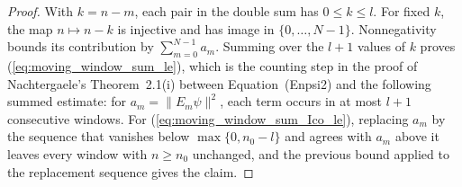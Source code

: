 \begin{proof}
    \leanok
    With $k=n-m$, each pair in the double sum has $0\leq k\leq l$.
    For fixed $k$, the map $n\mapsto n-k$ is injective and has image in
    $\{0,\ldots,N-1\}$. Nonnegativity bounds its contribution by
    $\sum_{m=0}^{N-1}a_m$. Summing over the $l+1$ values of $k$ proves
    (\ref{eq:moving_window_sum_le}), which is the counting step in the proof
    of Nachtergaele's Theorem~2.1(i)
    \cite[Proof of Theorem~2.1(i)]{Nachtergaele1996Spectral} between
    Equation~(Enpsi2) and the following summed estimate: for
    $a_m=\lVert E_m\psi\rVert^2$, each term occurs in at most $l+1$
    consecutive windows. For
    (\ref{eq:moving_window_sum_Ico_le}), replacing $a_m$ by the sequence that
    vanishes below $\max\{0,n_0-l\}$ and agrees with $a_m$ above it leaves every
    window with $n\geq n_0$ unchanged, and the previous bound applied to
    the replacement sequence gives the claim.
\end{proof}

